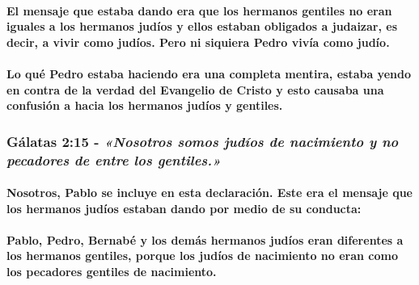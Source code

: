 \documentclass[11a pt,twoside]{article}
\newcommand{\scripture}[1]{%
  {\fontsize{12pt}{16pt}\selectfont\ScriptureFont\itshape #1}%
}
\let\oldsubsubsection\subsubsection
\renewcommand{\subsubsection}{\needspace{4\baselineskip}\oldsubsubsection}
\let\oldparagraph\paragraph
\renewcommand{\paragraph}{\needspace{3\baselineskip}\oldparagraph}
\begin{document}
\paragraph{El mensaje que estaba dando era que los hermanos gentiles no
eran iguales a los hermanos judíos y ellos estaban obligados a judaizar,
es decir, a vivir como judíos. Pero ni siquiera Pedro vivía como
judío.}\label{el-mensaje-que-estaba-dando-era-que-los-hermanos-gentiles-no-eran-iguales-a-los-hermanos-juduxedos-y-ellos-estaban-obligados-a-judaizar-es-decir-a-vivir-como-juduxedos.-pero-ni-siquiera-pedro-vivuxeda-como-juduxedo.}

\paragraph{Lo qué Pedro estaba haciendo era una completa mentira, estaba
yendo en contra de la verdad del Evangelio de Cristo y esto causaba una
confusión a hacia los hermanos judíos y
gentiles.}\label{lo-quuxe9-pedro-estaba-haciendo-era-una-completa-mentira-estaba-yendo-en-contra-de-la-verdad-del-evangelio-de-cristo-y-esto-causaba-una-confusiuxf3n-a-hacia-los-hermanos-juduxedos-y-gentiles.}

\subsubsection{\texorpdfstring{Gálatas 2:15 -
\scripture{«Nosotros somos judíos de nacimiento y no pecadores de entre los gentiles.»}}{Gálatas 2:15 - }}\label{guxe1latas-215---nosotros-somos-juduxedos-de-nacimiento-y-no-pecadores-de-entre-los-gentiles.}

\paragraph{Nosotros, Pablo se incluye en esta declaración. Este era el
mensaje que los hermanos judíos estaban dando por medio de su
conducta:}\label{nosotros-pablo-se-incluye-en-esta-declaraciuxf3n.-este-era-el-mensaje-que-los-hermanos-juduxedos-estaban-dando-por-medio-de-su-conducta}

\paragraph{Pablo, Pedro, Bernabé y los demás hermanos judíos eran
diferentes a los hermanos gentiles, porque los judíos de nacimiento no
eran como los pecadores gentiles de
nacimiento.}\label{pablo-pedro-bernabuxe9-y-los-demuxe1s-hermanos-juduxedos-eran-diferentes-a-los-hermanos-gentiles-porque-los-juduxedos-de-nacimiento-no-eran-como-los-pecadores-gentiles-de-nacimiento.}
\end{document}
